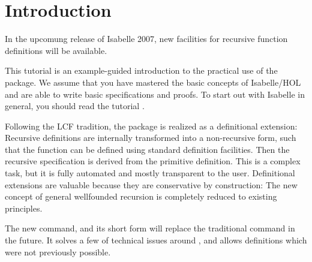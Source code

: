 \section{Introduction}

In the upcomung release of Isabelle 2007, new facilities for recursive
function definitions \cite{krauss2006} will be available.

This tutorial is an example-guided introduction to the practical use
of the package. We assume that you have mastered the basic concepts of
Isabelle/HOL and are able to write basic specifications and
proofs. To start out with Isabelle in general, you should read the
tutorial \cite{isa-tutorial}.


Following the LCF tradition, the package is realized as a definitional
extension: Recursive definitions are internally transformed into a
non-recursive form, such that the function can be defined using
standard definition facilities. Then the recursive specification is
derived from the primitive definition.  This is a complex task, but it
is fully automated and mostly transparent to the user. Definitional
extensions are valuable because they are conservative by construction:
The new concept of general wellfounded recursion is completely reduced
to existing principles.




The new  command, and its short form  will
replace the traditional  command \cite{slind-tfl} in the future. It solves
a few of technical issues around , and allows definitions
which were not previously possible.




